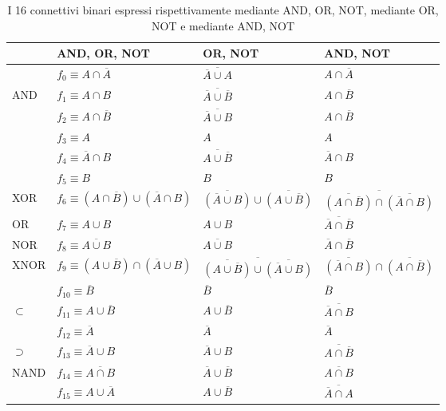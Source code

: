 \documentclass[a4paper]{extarticle}
\begin{document}
\begin{table}[H]
    \centering
    \begin{tabularx}{\textwidth}{|P||l|l|l|}
         \hline
         $ $ & AND, OR, NOT & OR, NOT & AND, NOT\\
         \hline
         \hline
         $ $ & $f_0 \equiv A \cap \overline{A}$ & $\overline{\overline{A} \cup A}$ & $A \cap \overline{A}$\\
         AND & $f_1 \equiv A \cap B$ & $\overline{\overline{A} \cup \overline{B}}$ & $A \cap \overline{B}$\\
         $ $ & $f_2 \equiv A \cap \overline{B}$ & $\overline{\overline{A} \cup B}$ & $A \cap \overline{B}$\\
         $ $ & $f_3 \equiv A$ & $A$ & $A$\\
         $ $ & $f_4 \equiv \overline{A} \cap B$ & $\overline{A \cup \overline{B}}$ & $\overline{A} \cap B$\\
         $ $ & $f_5 \equiv B$ & $B$ & $B$\\
         XOR & $f_6 \equiv (A \cap \overline{B}) \cup (\overline{A} \cap B)$ & $\overline{(\overline{A} \cup B)} \cup \overline{(A \cup \overline{B})}$ & $\overline{\overline{(A \cap \overline{B})} \cap \overline{(\overline{A} \cap B)}}$\\
         OR & $f_7 \equiv A \cup B$ & $A \cup B$ & $\overline{\overline{A} \cap \overline{B}}$\\
         NOR & $f_8 \equiv \overline{A \cup B}$ & $\overline{A \cup B}$ & $\overline{A} \cap \overline{B}$\\
         XNOR & $f_9 \equiv (A \cup \overline{B}) \cap (\overline{A} \cup B)$ & $\overline{\overline{(A \cup \overline{B})} \cup \overline{(\overline{A} \cup B)}}$ & $\overline{(\overline{A} \cap B)} \cap \overline{(A \cap \overline{B})}$\\
         $ $ & $f_{10} \equiv \overline{B}$ & $\overline{B}$ & $\overline{B}$\\
         $\subset$ & $f_{11} \equiv A \cup \overline{B}$ & $A \cup \overline{B}$ & $\overline{\overline{A} \cap B}$\\
         $ $ & $f_{12} \equiv \overline{A}$ & $\overline{A}$ & $\overline{A}$\\
         $\supset$ & $f_{13} \equiv \overline{A} \cup B$ & $\overline{A} \cup B$ & $\overline{A \cap \overline{B}}$\\
         NAND & $f_{14} \equiv \overline{A \cap B}$ & $\overline{A} \cup \overline{B}$ & $\overline{A \cap B}$\\
         $ $ & $f_{15} \equiv A \cup \overline{A}$ & $A \cup \overline{B}$ & $\overline{\overline{A} \cap A}$\\
         \hline
    \end{tabularx}
    \caption{I 16 connettivi binari espressi rispettivamente mediante AND, OR, NOT, mediante OR, NOT e mediante AND, NOT}
    \label{tab:connettivi_espressi_con_AND_OR_NOT_OR_NOT_AND_NOT}
\end{table}
\end{document}
